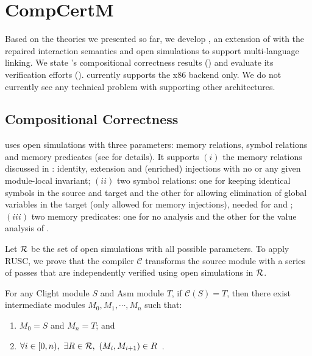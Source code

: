 \section{CompCertM}
\label{sec:compiler:compcertm}

Based on the theories we presented so far, we develop \ccm{}, an extension of \cc{} with the
repaired interaction semantics and open simulations to support multi-language linking.  We state
\ccm{}'s compositional correctness results () and evaluate its
verification efforts ().  \ccm{} currently supports the x86 backend only.
We do not currently see any technical problem with supporting other architectures.

\subsection{Compositional Correctness}
\label{sec:results:compiler}

\ccm{} uses open simulations with three parameters:
memory relations, symbol relations and memory predicates
(see  for details).
It supports $(i)$ the memory relations discussed in :
identity, extension and (enriched) injections with no or any given module-local invariant;
$(ii)$ two symbol relations: one for keeping identical symbols in the source and target
and the other for allowing elimination of global variables in the target (only allowed for memory injections), needed for  and ;
$(iii)$ two memory predicates: one for no analysis and the other for the value analysis of \cc{}.

Let $\mathcal{R}$ be the set of open simulations with all possible parameters.
To apply RUSC, we prove that the \ccm{} compiler $\mathcal{C}$ transforms the source module with
a series of passes that are independently verified using open simulations in $\mathcal{R}$.
\begin{lemma}\label{thm:results-passes}
  For any \textrm{Clight} module $S$ and \textrm{Asm} module $T$, if $\mathcal{C}(S) = T$, then
  there exist intermediate modules $M_0, M_1, \cdots, M_n$ such that:
  \begin{enumerate}
  \item $M_0 = S$ and $M_n = T$; and
  \item $\forall i \in [0,n),~ \exists R \in \mathcal{R},~ (M_i, M_{i+1}) \in R$~.
  \end{enumerate}
\end{lemma}

